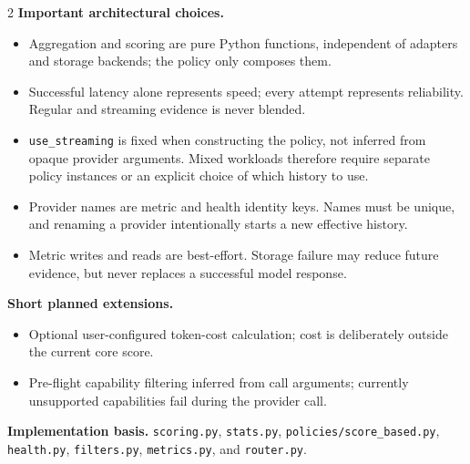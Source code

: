 \documentclass[10pt,a4paper]{article}
\newcommand{\code}[1]{\texttt{\small #1}}
\begin{document}
\begin{multicols}{2}
\textbf{Important architectural choices.}
\begin{itemize}
    \item Aggregation and scoring are pure Python functions, independent of
    adapters and storage backends; the policy only composes them.
    \item Successful latency alone represents speed; every attempt represents
    reliability. Regular and streaming evidence is never blended.
    \item \code{use\_streaming} is fixed when constructing the policy, not inferred
    from opaque provider arguments. Mixed workloads therefore require separate
    policy instances or an explicit choice of which history to use.
    \item Provider names are metric and health identity keys. Names must be
    unique, and renaming a provider intentionally starts a new effective history.
    \item Metric writes and reads are best-effort. Storage failure may reduce
    future evidence, but never replaces a successful model response.
\end{itemize}

\textbf{Short planned extensions.}
\begin{itemize}
    \item Optional user-configured token-cost calculation; cost is deliberately
    outside the current core score.
    \item Pre-flight capability filtering inferred from call arguments; currently
    unsupported capabilities fail during the provider call.
\end{itemize}

\textbf{Implementation basis.}
\code{scoring.py}, \code{stats.py}, \code{policies/score\_based.py},
\code{health.py}, \code{filters.py}, \code{metrics.py}, and \code{router.py}.

\end{multicols}
\end{document}
